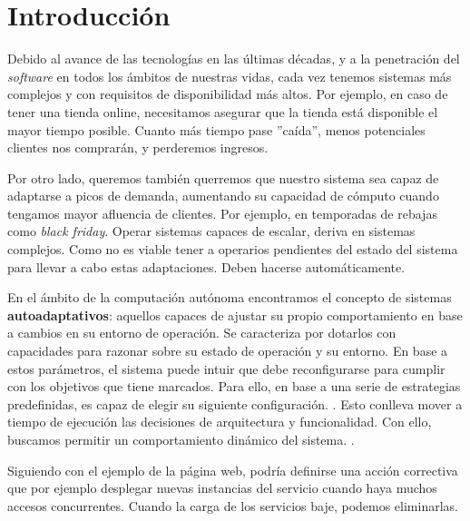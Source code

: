 
\chapter{Introducción}
\label{chap:introduccion}

Debido al avance de las tecnologías en las últimas décadas, y a la penetración del \emph{software} en todos los ámbitos de nuestras vidas, cada vez tenemos sistemas más complejos y con requisitos de disponibilidad más altos. Por ejemplo, en caso de tener una tienda online, necesitamos asegurar que la tienda está disponible el mayor tiempo posible. Cuanto más tiempo pase ''caída'', menos potenciales clientes nos comprarán, y perderemos ingresos.

Por otro lado, queremos también querremos que nuestro sistema sea capaz de adaptarse a picos de demanda, aumentando su capacidad de cómputo cuando tengamos mayor afluencia de clientes. Por ejemplo, en temporadas de rebajas como \emph{black friday}. Operar sistemas capaces de escalar, deriva en sistemas complejos. Como no es viable tener a operarios pendientes del estado del sistema para llevar a cabo estas adaptaciones. Deben hacerse automáticamente.

En el ámbito de la computación autónoma encontramos el concepto de sistemas \textbf{autoadaptativos}: aquellos capaces de ajustar su propio comportamiento en base a cambios en su entorno de operación. Se caracteriza por dotarlos con capacidades para razonar sobre su estado de operación y su entorno. En base a estos parámetros, el sistema puede intuir que debe reconfigurarse para cumplir con los objetivos que tiene marcados. Para ello, en base a una serie de estrategias predefinidas, es capaz de elegir su siguiente configuración. \cite{garlanIncreasingSystemDependability2003}. Esto conlleva mover a tiempo de ejecución las decisiones de arquitectura y funcionalidad. Con ello, buscamos permitir un comportamiento dinámico del sistema. \cite{brunEngineeringSelfAdaptiveSystems2009}.

Siguiendo con el ejemplo de la página web, podría definirse una acción correctiva que por ejemplo desplegar nuevas instancias del servicio cuando haya muchos accesos concurrentes. Cuando la carga de los servicios baje, podemos eliminarlas.

